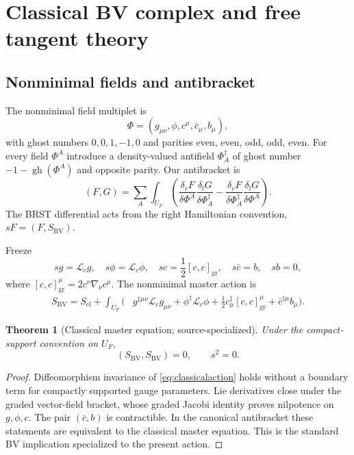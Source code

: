 \documentclass[11pt]{article}
\newtheorem{theorem}{Theorem}[section]
\theoremstyle{definition}
\theoremstyle{remark}
\newcommand{\U}{U_{F}}
\newcommand{\cbar}{\bar c}
\newcommand{\gh}{\operatorname{gh}}
\begin{document}
\section{Classical BV complex and free tangent theory}

\subsection{Nonminimal fields and antibracket}

The nonminimal field multiplet is
\begin{equation}
 \Phi=(g_{\mu\nu},\phi,c^\mu,\cbar_\mu,b_\mu),
\end{equation}
with ghost numbers $0,0,1,-1,0$ and parities even, even, odd, odd, even.  For every
field $\Phi^A$ introduce a density-valued antifield $\Phi_A^\ddagger$ of ghost number
$-1-\gh(\Phi^A)$ and opposite parity.  Our antibracket is
\begin{equation}
 (F,G)=\sum_A\int_{\U}\left(
 \frac{\delta_rF}{\delta\Phi^A}\frac{\delta_lG}{\delta\Phi_A^\ddagger}
 -\frac{\delta_rF}{\delta\Phi_A^\ddagger}\frac{\delta_lG}{\delta\Phi^A}
 \right).
 \label{eq:antibracket}
\end{equation}
The BRST differential acts from the right Hamiltonian convention,
$sF=(F,S_{\mathrm{BV}})$.

Freeze
\begin{equation}
 sg=\mathcal L_cg,
 \quad s\phi=\mathcal L_c\phi,
 \quad sc=\frac12[c,c]_{\mathrm{gr}},
 \quad s\cbar=b,
 \quad sb=0,
 \label{eq:brstfull}
\end{equation}
where $[c,c]^\mu_{\mathrm{gr}}=2c^\nu\nabla_\nu c^\mu$.  The nonminimal master action is
\begin{align}
 S_{\mathrm{BV}}=S_{\mathrm{cl}}+
 \int_{\U}\bigl(&g^{\ddagger\mu\nu}\mathcal L_cg_{\mu\nu}
 +\phi^\ddagger\mathcal L_c\phi
 +\tfrac12c^\ddagger_\mu[c,c]^\mu_{\mathrm{gr}}
 +\cbar^{\ddagger\mu}b_\mu\bigr).
 \label{eq:bvaction}
\end{align}

\begin{theorem}[Classical master equation; source-specialized]
Under the compact-support convention on $\U$,
\begin{equation}
 (S_{\mathrm{BV}},S_{\mathrm{BV}})=0,
 \qquad s^2=0.
\end{equation}
\end{theorem}

\begin{proof}
Diffeomorphism invariance of \cref{eq:classicalaction} holds without a boundary term for
compactly supported gauge parameters.  Lie derivatives close under the graded
vector-field bracket, whose graded Jacobi identity proves nilpotence on $g,\phi,c$.
The pair $(\cbar,b)$ is contractible.  In the canonical antibracket these statements
are equivalent to the classical master equation.  This is the standard BV implication
\cite{BatalinVilkovisky1981,FredenhagenRejzner2012} specialized to the present action.
\end{proof}
\end{document}
